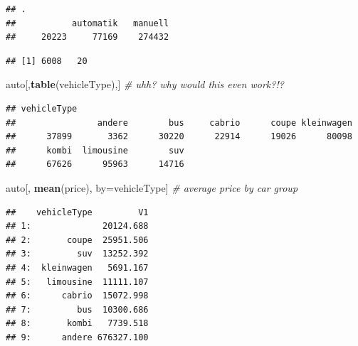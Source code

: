 \documentclass[]{book}
\newenvironment{Shaded}{\begin{snugshade}}{\end{snugshade}}
\newcommand{\CommentTok}[1]{\textcolor[rgb]{0.56,0.35,0.01}{\textit{#1}}}
\newcommand{\KeywordTok}[1]{\textcolor[rgb]{0.13,0.29,0.53}{\textbf{#1}}}
\newcommand{\NormalTok}[1]{#1}
\newcommand{\OperatorTok}[1]{\textcolor[rgb]{0.81,0.36,0.00}{\textbf{#1}}}
\newcommand{\StringTok}[1]{\textcolor[rgb]{0.31,0.60,0.02}{#1}}
\theoremstyle{definition}
\theoremstyle{definition}
\theoremstyle{definition}
\theoremstyle{remark}
\begin{document}
\begin{Shaded}
\end{Shaded}

\begin{verbatim}
## .
##           automatik   manuell 
##     20223     77169    274432
\end{verbatim}

\begin{Shaded}
\end{Shaded}

\begin{verbatim}
## [1] 6008   20
\end{verbatim}

\begin{Shaded}
\begin{Highlighting}[]
\NormalTok{auto[,}\KeywordTok{table}\NormalTok{(vehicleType),] }\CommentTok{# uhh? why would this even work?!?}
\end{Highlighting}
\end{Shaded}

\begin{verbatim}
## vehicleType
##                andere        bus     cabrio      coupe kleinwagen 
##      37899       3362      30220      22914      19026      80098 
##      kombi  limousine        suv 
##      67626      95963      14716
\end{verbatim}

\begin{Shaded}
\begin{Highlighting}[]
\NormalTok{auto[, }\KeywordTok{mean}\NormalTok{(price), by=vehicleType] }\CommentTok{# average price by car group}
\end{Highlighting}
\end{Shaded}

\begin{verbatim}
##    vehicleType         V1
## 1:              20124.688
## 2:       coupe  25951.506
## 3:         suv  13252.392
## 4:  kleinwagen   5691.167
## 5:   limousine  11111.107
## 6:      cabrio  15072.998
## 7:         bus  10300.686
## 8:       kombi   7739.518
## 9:      andere 676327.100
\end{verbatim}
\end{document}
